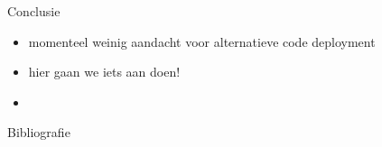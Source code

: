 \documentclass[presentation, bigger]{beamer}
\begin{document}
\begin{frame}[label=sec-4-2]{Conclusie}
  \begin{itemize}
  \item momenteel weinig aandacht voor alternatieve code deployment
  \item hier gaan we iets aan doen!
  \item 
  \end{itemize}
\end{frame}
\begin{frame}[allowframebreaks]{Bibliografie}
  \nocite{*}
  \printbibliography
\end{frame}

\end{document}
